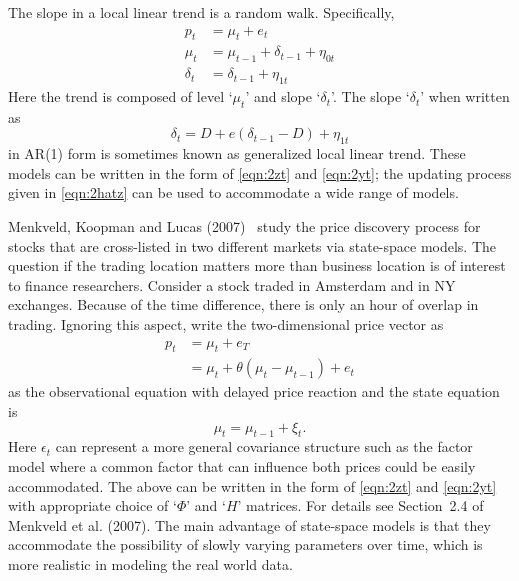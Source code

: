 \begin{ex}
The slope in a local linear trend is a random walk. Specifically,
	\begin{equation} \label{eqn:randomwalk}
	\begin{aligned}
	p_t&= \mu_t + e_t \\
	\mu_t&= \mu_{t-1} + \delta_{t-1} + \eta_{0t} \\
	\delta_t&= \delta_{t-1} + \eta_{1t}
	\end{aligned}
	\end{equation}
Here the trend is composed of level `$\mu_t$' and slope `$\delta_t$'. The slope `$\delta_t$' when written as 
	\begin{equation} \label{eqn:slopewritten}
	\delta_t= D+ e(\delta_{t-1} - D)+ \eta_{1t}
	\end{equation}
in AR(1) form is sometimes known as generalized local linear trend. These models can be written in the form of \eqref{eqn:2zt} and \eqref{eqn:2yt}; the updating process given in \eqref{eqn:2hatz} can be used to accommodate a wide range of models. \xqed
\end{ex}


\begin{ex}
Menkveld, Koopman and Lucas (2007)~\cite{menkkoop} study the price discovery process for stocks that are cross-listed in two different markets via state-space models. The question if the trading location matters more than business location is of interest to finance researchers. Consider a stock traded in Amsterdam and in NY exchanges. Because of the time difference, there is only an hour of overlap in trading. Ignoring this aspect, write the two-dimensional price vector as
	\begin{equation}
	\begin{aligned}
	p_t&= \mu_t + e_T \\
	&=\mu_t + \theta(\mu_t - \mu_{t-1}) + e_t
	\end{aligned}
	\end{equation}
as the observational equation with delayed price reaction and the state equation is
	\begin{equation}
	\mu_t= \mu_{t-1} + \xi_t.
	\end{equation}
Here $\epsilon_t$ can represent a more general covariance structure such as the factor model where a common factor that can influence both prices could be easily accommodated. The above can be written in the form of \eqref{eqn:2zt} and \eqref{eqn:2yt} with appropriate choice of `$\Phi$' and `$H$' matrices. For details see Section~2.4 of Menkveld et al. (2007)\cite{menkkoop}. The main advantage of state-space models is that they accommodate the possibility of slowly varying parameters over time, which is more realistic in modeling the real world data. \xqed
\end{ex}


